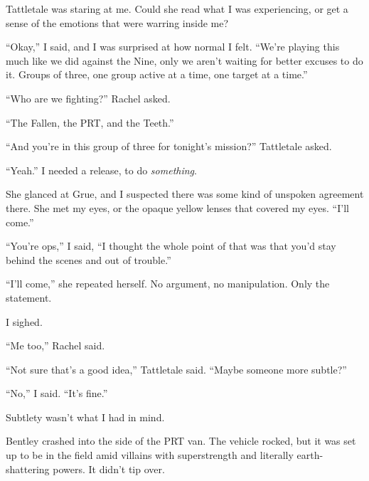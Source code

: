 Tattletale was staring at me.  Could she read what I was experiencing, or get a sense of the emotions that were warring inside me?



``Okay,'' I said, and I was surprised at how normal I felt.  ``We're playing this much like we did against the Nine, only we aren't waiting for better excuses to do it.  Groups of three, one group active at a time, one target at a time.''



``Who are we fighting?'' Rachel asked.



``The Fallen, the PRT, and the Teeth.''



``And you're in this group of three for tonight's mission?'' Tattletale asked.



``Yeah.''  I needed a release, to do \emph{something}.



She glanced at Grue, and I suspected there was some kind of unspoken agreement there.  She met my eyes, or the opaque yellow lenses that covered my eyes.  ``I'll come.''



``You're ops,'' I said, ``I thought the whole point of that was that you'd stay behind the scenes and out of trouble.''



``I'll come,'' she repeated herself.  No argument, no manipulation.  Only the statement.



I sighed.



``Me too,'' Rachel said.



``Not sure that's a good idea,'' Tattletale said.  ``Maybe someone more subtle?''



``No,'' I said.  ``It's fine.''



Subtlety wasn't what I had in mind.



\blacksquare



Bentley crashed into the side of the PRT van.  The vehicle rocked, but it was set up to be in the field amid villains with superstrength and literally earth-shattering powers.  It didn't tip over.



